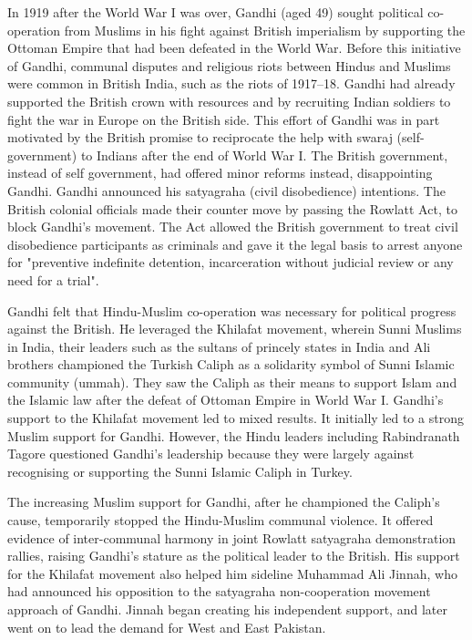 In 1919 after the World War I was over, Gandhi (aged 49) sought
political co-operation from Muslims in his fight against British
imperialism by supporting the Ottoman Empire that had been defeated in
the World War. Before this initiative of Gandhi, communal disputes and
religious riots between Hindus and Muslims were common in British India,
such as the riots of 1917--18. Gandhi had already supported the British
crown with resources and by recruiting Indian soldiers to fight the war
in Europe on the British side. This effort of Gandhi was in part
motivated by the British promise to reciprocate the help with swaraj
(self-government) to Indians after the end of World War I. The British
government, instead of self government, had offered minor reforms
instead, disappointing Gandhi. Gandhi announced his satyagraha (civil
disobedience) intentions. The British colonial officials made their
counter move by passing the Rowlatt Act, to block Gandhi's movement. The
Act allowed the British government to treat civil disobedience
participants as criminals and gave it the legal basis to arrest anyone
for "preventive indefinite detention, incarceration without judicial
review or any need for a trial".

Gandhi felt that Hindu-Muslim co-operation was necessary for political
progress against the British. He leveraged the Khilafat movement,
wherein Sunni Muslims in India, their leaders such as the sultans of
princely states in India and Ali brothers championed the Turkish Caliph
as a solidarity symbol of Sunni Islamic community (ummah). They saw the
Caliph as their means to support Islam and the Islamic law after the
defeat of Ottoman Empire in World War I. Gandhi's support to the
Khilafat movement led to mixed results. It initially led to a strong
Muslim support for Gandhi. However, the Hindu leaders including
Rabindranath Tagore questioned Gandhi's leadership because they were
largely against recognising or supporting the Sunni Islamic Caliph in
Turkey.

The increasing Muslim support for Gandhi, after he championed the
Caliph's cause, temporarily stopped the Hindu-Muslim communal violence.
It offered evidence of inter-communal harmony in joint Rowlatt
satyagraha demonstration rallies, raising Gandhi's stature as the
political leader to the British. His support for the Khilafat movement
also helped him sideline Muhammad Ali Jinnah, who had announced his
opposition to the satyagraha non-cooperation movement approach of
Gandhi. Jinnah began creating his independent support, and later went on
to lead the demand for West and East Pakistan.

